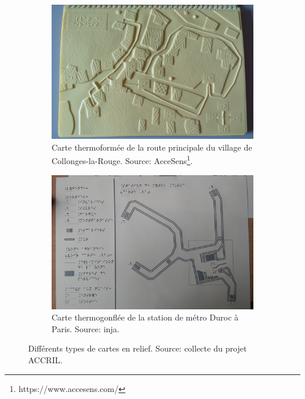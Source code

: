 \begin{figure}[ht]
    \centering
    \begin{subfigure}[t]{0.49\textwidth}
        \centering
        \includegraphics[width=\textwidth]{images/etat_art/carte_tf_collonges.jpg}
        \caption{Carte thermoformée de la route principale du village de Collonges-la-Rouge. Source: AcceSens\footnote{https://www.accesens.com/}.}
    \end{subfigure}
    \hfill
    \begin{subfigure}[t]{0.49\textwidth}
        \centering
        \includegraphics[width=\textwidth]{images/etat_art/carte_tg_duroc.jpg}
        \caption{Carte thermogonflée de la station de métro Duroc à Paris. Source: \gls{inja}.}
    \end{subfigure}
    \caption[Différents types de cartes en relief]{Différents types de cartes en relief. Source: collecte du projet ACCRIL\footnotemark.}
    \label{fig:excartestactiles}
\end{figure}


